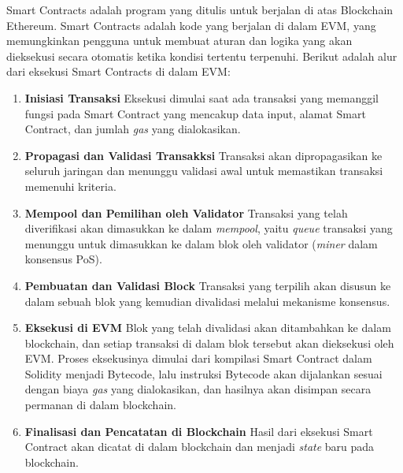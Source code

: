 Smart Contracts adalah program yang ditulis untuk berjalan di atas Blockchain Ethereum. Smart Contracts adalah kode yang berjalan di dalam EVM, yang memungkinkan pengguna untuk membuat aturan dan logika yang akan dieksekusi secara otomatis ketika kondisi tertentu terpenuhi. Berikut adalah alur dari eksekusi Smart Contracts di dalam EVM:

\begin{enumerate}
	\item \textbf{Inisiasi Transaksi} \newline
	      Eksekusi dimulai saat ada transaksi yang memanggil fungsi pada Smart Contract yang mencakup data input, alamat Smart Contract, dan jumlah \textit{gas} yang dialokasikan.
	\item \textbf{Propagasi dan Validasi Transakksi} \newline
	      Transaksi akan dipropagasikan ke seluruh jaringan dan menunggu validasi awal untuk memastikan transaksi memenuhi kriteria.
	\item \textbf{Mempool dan Pemilihan oleh Validator} \newline
	      Transaksi yang telah diverifikasi akan dimasukkan ke dalam \textit{mempool}, yaitu \textit{queue} transaksi yang menunggu untuk dimasukkan ke dalam blok oleh validator (\textit{miner} dalam konsensus PoS).
	\item \textbf{Pembuatan dan Validasi Block} \newline
	      Transaksi yang terpilih akan disusun ke dalam sebuah blok yang kemudian divalidasi melalui mekanisme konsensus.
	\item \textbf{Eksekusi di EVM} \newline
	      Blok yang telah divalidasi akan ditambahkan ke dalam blockchain, dan setiap transaksi di dalam blok tersebut akan dieksekusi oleh EVM. Proses eksekusinya dimulai dari kompilasi Smart Contract dalam Solidity menjadi Bytecode, lalu instruksi Bytecode akan dijalankan sesuai dengan biaya \textit{gas} yang dialokasikan, dan hasilnya akan disimpan secara permanan di dalam blockchain.
	\item \textbf{Finalisasi dan Pencatatan di Blockchain} \newline
	      Hasil dari eksekusi Smart Contract akan dicatat di dalam blockchain dan menjadi \textit{state} baru pada blockchain.
\end{enumerate}

